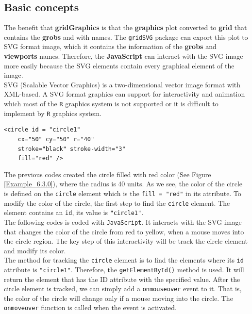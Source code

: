 \documentclass{report}
\begin{document}
\subsection{Basic concepts}
The benefit that \textbf{gridGraphics} is that the \textbf{graphics} plot converted to \textbf{grid} that contains the \textbf{grobs} and  with names. The \texttt{gridSVG} \citep{gridSVG} package can export this plot to SVG format image, which it contains the information of the \textbf{grobs} and \textbf{viewports} names. Therefore, the \textbf{JavaScript} \citep{javascript} can interact with the SVG image more easily because the SVG elements contain every graphical element of the image.\\

SVG (Scalable Vector Graphics) \citep{SVG} is a two-dimensional vector image format with XML-based. A SVG format graphics can support for interactivity and animation which most of the \texttt{R} graphics system is not supported or it is difficult to implement by \texttt{R} graphics system.\\

\begin{lstlisting}
<circle id = "circle1" 
    cx="50" cy="50" r="40" 
    stroke="black" stroke-width="3" 
    fill="red" />
\end{lstlisting}

The previous codes created the circle filled with red color (See Figure \ref{Example_6.3.0}), where the radius is 40 units. As we see, the color of the circle is defined on the \texttt{circle} element which is the \texttt{fill = "red"} in its attribute. To modify the color of the circle, the first step to find the \texttt{circle} element. The element contains an \texttt{id}, its value is \texttt{"circle1"}.\\

The following codes is coded with \texttt{JavaScript}. It interacts with the SVG image that changes the color of the circle from red to yellow, when a mouse moves into the circle region. The key step of this interactivity will be track the circle element and modify its color.\\

The method for tracking the \texttt{circle} element is to find the elements where its \texttt{id} attribute is \texttt{"circle1"}. Therefore, the \texttt{getElementById()} method is used. It will return the element that has the ID attribute with the specified value. After the circle element is tracked, we can simply add a \texttt{onmouseover} event to it. That is, the color of the circle will change only if a mouse moving into the circle. The \texttt{onmoveover} function is called when the event is activated.\\ 
\end{document}
